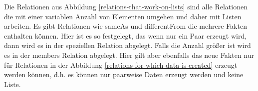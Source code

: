 \begin{figure}
\end{figure}
Die Relationen aus Abbildung \ref{relations-that-work-on-lists} sind alle Relationen die mit einer variablen Anzahl von Elementen umgehen und daher mit Listen arbeiten. Es gibt Relationen wie sameAs und differentFrom die mehrere Fakten enthalten können. Hier ist es so festgelegt, das wenn nur ein Paar erzeugt wird, dann wird es in der speziellen Relation abgelegt. Falls die Anzahl größer ist wird es in der members Relation abgelegt. Hier gilt aber ebenfalls das neue Fakten nur für Relationen in der Abbildung \ref{relations-for-which-data-is-created} erzeugt werden können, d.h. es können nur paarweise Daten erzeugt werden und keine Liste.

